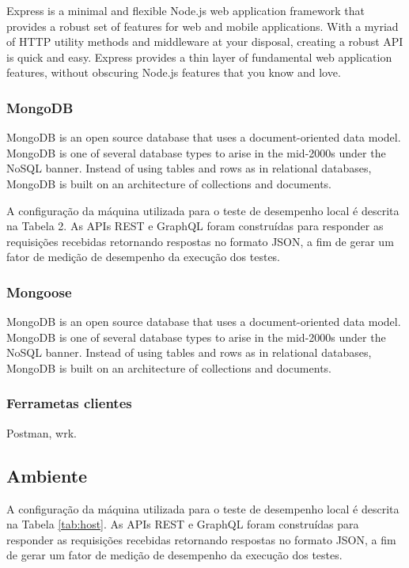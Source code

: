 Express is a minimal and flexible Node.js web application framework that provides a robust set of features for web and mobile applications. With a myriad of HTTP utility methods and middleware at your disposal, creating a robust API is quick and easy. Express provides a thin layer of fundamental web application features, without obscuring Node.js features that you know and love.

\subsubsection*{MongoDB}

MongoDB is an open source database that uses a document-oriented data model. MongoDB is one of several database types to arise in the mid-2000s under the NoSQL banner. Instead of using tables and rows as in relational databases, MongoDB is built on an architecture of collections and documents.

A configuração da máquina utilizada para o teste de desempenho local é descrita na Tabela 2. As APIs REST e GraphQL foram construídas para responder as requisições recebidas retornando respostas no formato JSON, a fim de gerar um fator de medição de desempenho da execução dos testes.

\subsubsection*{Mongoose}

MongoDB is an open source database that uses a document-oriented data model. MongoDB is one of several database types to arise in the mid-2000s under the NoSQL banner. Instead of using tables and rows as in relational databases, MongoDB is built on an architecture of collections and documents.

\subsubsection*{Ferrametas clientes}

Postman, wrk.


\subsection{Ambiente}

A configuração da máquina utilizada para o teste de desempenho local é descrita na Tabela \ref{tab:host}. As APIs REST e GraphQL foram construídas para responder as requisições recebidas retornando respostas no formato JSON, a fim de gerar um fator de medição de desempenho da execução dos testes.

